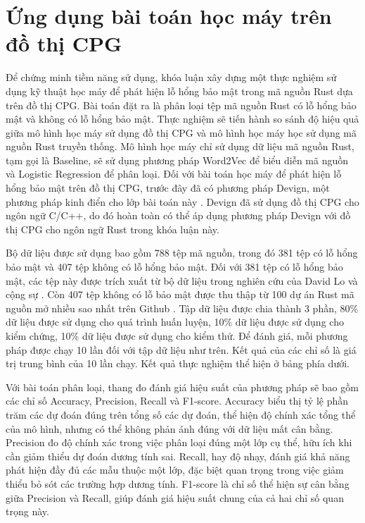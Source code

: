 \section{Ứng dụng bài toán học máy trên đồ thị CPG}


Để chứng minh tiềm năng sử dụng, khóa luận xây dựng một thực nghiệm sử dụng kỹ thuật học máy để phát hiện lỗ hổng bảo mật trong mã nguồn Rust dựa trên đồ thị CPG.
Bài toán đặt ra là phân loại tệp mã nguồn Rust có lỗ hổng bảo mật và không có lỗ hổng bảo mật.
Thực nghiệm sẽ tiến hành so sánh độ hiệu quả giữa mô hình học máy sử dụng đồ thị CPG và mô hình học máy học sử dụng mã nguồn Rust truyền thống.
Mô hình học máy chỉ sử dụng dữ liệu mã nguồn Rust, tạm gọi là Baseline, sẽ sử dụng phương pháp Word2Vec \cite{church2017word2vec} để biểu diễn mã nguồn và Logistic Regression \cite{lavalley2008logistic} để phân loại.
Đối với bài toán học máy để phát hiện lỗ hổng bảo mật trên đồ thị CPG, trước đây đã có phương pháp Devign, một phương pháp kinh điển cho lớp bài toán này \cite{zhou2019devign}.
Devign đã sử dụng đồ thị CPG cho ngôn ngữ C/C++, do đó hoàn toàn có thể áp dụng phương pháp Devign với đồ thị CPG cho ngôn ngữ Rust trong khóa luận này.

Bộ dữ liệu được sử dụng bao gồm 788 tệp mã nguồn, trong đó 381 tệp có lỗ hổng bảo mật và 407 tệp không có lỗ hổng bảo mật.
Đối với 381 tệp có lỗ hổng bảo mật, các tệp này được trích xuất từ bộ dữ liệu trong nghiên cứu của David Lo và cộng sự \cite{zheng2023closer}.
Còn 407 tệp không có lỗ bảo mật được thu thập từ 100 dự án Rust  mã nguồn mở nhiều sao nhất trên Github \cite{githubGithubRankingTop100RustmdMaster}.
Tập dữ liệu được chia thành 3 phần, 80\% dữ liệu được sử dụng cho quá trình huấn luyện, 10\% dữ liệu được sử dụng cho kiểm chứng, 10\% dữ liệu được sử dụng cho kiểm thử.
Để đánh giá, mỗi phương pháp được chạy 10 lần đối với tập dữ liệu như trên.
Kết quả của các chỉ số là giá trị trung bình của 10 lần chạy.
Kết quả thực nghiệm thể hiện ở bảng phía dưới.

Với bài toán phân loại, thang đo đánh giá hiệu suất của phương pháp sẽ bao gồm các chỉ số Accuracy, Precision, Recall và F1-score.
Accuracy biểu thị tỷ lệ phần trăm các dự đoán đúng trên tổng số các dự đoán, thể hiện độ chính xác tổng thể của mô hình, nhưng có thể không phản ánh đúng với dữ liệu mất cân bằng.
Precision đo độ chính xác trong việc phân loại đúng một lớp cụ thể, hữu ích khi cần giảm thiểu dự đoán dương tính sai.
Recall, hay độ nhạy, đánh giá khả năng phát hiện đầy đủ các mẫu thuộc một lớp, đặc biệt quan trọng trong việc giảm thiểu bỏ sót các trường hợp dương tính.
F1-score là chỉ số thể hiện sự cân bằng giữa Precision và Recall, giúp đánh giá hiệu suất chung của cả hai chỉ số quan trọng này.

